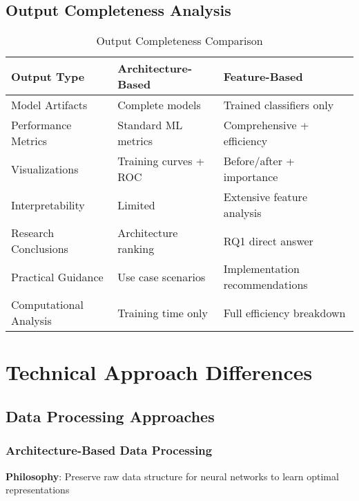 \documentclass[11pt,a4paper]{article}
\begin{document}
\subsection{Output Completeness Analysis}

\begin{table}[h]
\centering
\caption{Output Completeness Comparison}
\begin{tabular}{@{}lll@{}}
\toprule
\textbf{Output Type} & \textbf{Architecture-Based} & \textbf{Feature-Based} \\
\midrule
Model Artifacts & Complete models & Trained classifiers only \\
Performance Metrics & Standard ML metrics & Comprehensive + efficiency \\
Visualizations & Training curves + ROC & Before/after + importance \\
Interpretability & Limited & Extensive feature analysis \\
Research Conclusions & Architecture ranking & RQ1 direct answer \\
Practical Guidance & Use case scenarios & Implementation recommendations \\
Computational Analysis & Training time only & Full efficiency breakdown \\
\bottomrule
\end{tabular}
\end{table}

\section{Technical Approach Differences}

\subsection{Data Processing Approaches}

\subsubsection{Architecture-Based Data Processing}
\textbf{Philosophy}: Preserve raw data structure for neural networks to learn optimal representations
\end{document}
